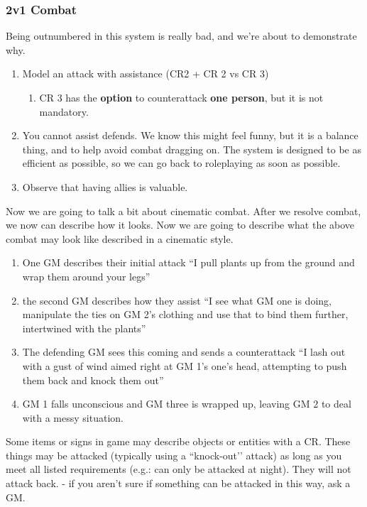 \documentclass[green]{GL2020}
\begin{document}
\subsubsection*{2v1 Combat}
Being outnumbered in this system is really bad, and we're about to demonstrate why.
\begin{enumerate}
	\item Model an attack with assistance (CR2 + CR 2 vs CR 3)
	\begin{enumerate}
		\item CR 3 has the \textbf{option} to counterattack \textbf{one person}, but it is not mandatory.
	\end{enumerate}
	\item You cannot assist defends. We know this might feel funny, but it is a balance thing, and to help avoid combat dragging on. The system is designed to be as efficient as possible, so we can go back to roleplaying as soon as possible.
	\item Observe that having allies is valuable.
\end{enumerate}


Now we are going to talk a bit about cinematic combat.  After we resolve combat, we now can describe how it looks.  Now we are going to describe what the above combat may look like described in a cinematic style.
\begin{enumerate}
	\item One GM describes their initial attack “I pull plants up from the ground and wrap them around your legs”
	\item the second GM describes how they assist “I see what GM one is doing, manipulate the ties on GM 2’s clothing and use that to bind them further, intertwined with the plants”
	\item The defending GM sees this coming and sends a counterattack “I lash out with a gust of wind aimed right at GM 1’s one’s head, attempting to push them back and knock them out”
	\item GM 1 falls unconscious and GM three is wrapped up, leaving GM 2 to deal with a messy situation.
\end{enumerate}

Some items or signs in game may describe objects or entities with a CR. These things may be attacked (typically using a ``knock-out’’ attack) as long as you meet all listed requirements (e.g.: can only be attacked at night). They will not attack back. - if you aren’t sure if something can be attacked in this way, ask a GM.
\end{document}

